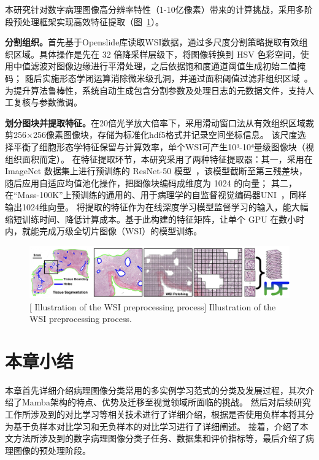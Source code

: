 本研究针对数字病理图像高分辨率特性（1-10亿像素）带来的计算挑战，采用多阶段预处理框架实现高效特征提取（图~\ref{figure1: 数字病理图像的预处理过程示意图}）。

\textbf{分割组织。}首先基于Openslide库读取WSI数据，通过多尺度分割策略提取有效组织区域。具体操作是先在 32 倍降采样层级下，将图像转换到 HSV 色彩空间，使用中值滤波对图像边缘进行平滑处理，之后依据饱和度通道阈值生成初始二值掩码；
随后实施形态学闭运算消除微米级孔洞，并通过面积阈值过滤非组织区域~\cite{lu2021data}。
为提升算法鲁棒性，系统自动生成包含分割参数及处理日志的元数据文件，支持人工复核与参数微调。

\textbf{划分图块并提取特征。}在20倍光学放大倍率下，采用滑动窗口法从有效组织区域裁剪256×256像素图像块，存储为标准化hdf5格式并记录空间坐标信息。
该尺度选择平衡了细胞形态学特征保留与计算效率，单个WSI可产生10³-10⁴量级图像块（视组织面积而定）。
在特征提取环节，本研究采用了两种特征提取器：其一，采用在 ImageNet 数据集上进行预训练的 ResNet-50 模型~\cite{he2016deep}，该模型截断至第三残差块，随后应用自适应均值池化操作，把图像块编码成维度为 1024 的向量；
其二， 在“Mass-100K”上预训练的通用的、用于病理学的自监督视觉编码器UNI~\cite{chen2024towards}，同样输出1024维向量。
将提取的特征作为在线深度学习模型监督学习的输入，能大幅缩短训练时间、降低计算成本。基于此构建的特征矩阵，让单个 GPU 在数小时内，就能完成万级全切片图像（WSI）的模型训练。

\begin{figure}[h]
    \centering
    \includegraphics[width=1.0\columnwidth]{figures/RelatedWork/CLAM1.jpg}
    [ Illustration of the WSI preprocessing process]{ Illustration of the WSI preprocessing process.~\cite{lu2021data}}
    \label{figure1: 数字病理图像的预处理过程示意图}
\end{figure}
\section[\hspace{-2pt}本章小结]{{\heiti{} \hspace{-8pt}本章小结}}\label{section2: 本章小结}

本章首先详细介绍病理图像分类常用的多实例学习范式的分类及发展过程，其次介绍了Mamba架构的特点、优势及迁移至视觉领域所面临的挑战。
然后对后续研究工作所涉及到的对比学习等相关技术进行了详细介绍，根据是否使用负样本将其分为基于负样本对比学习和无负样本的对比学习进行了详细阐述。
接着，介绍了本文方法所涉及到的数字病理图像分类子任务、数据集和评价指标等，最后介绍了病理图像的预处理阶段。
